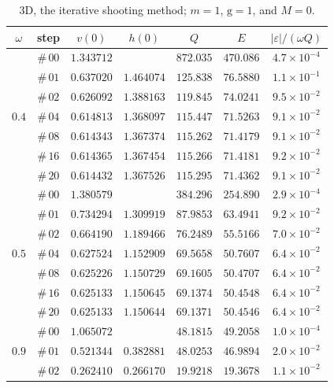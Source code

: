 \documentclass[12pt]{extarticle}
\newcommand{\coupling}{\mathrm{g}}
\theoremstyle{plain}
\theoremstyle{remark}
\begin{document}
\begin{table}[!ht]
\begin{center}
\caption{\footnotesize
3D, the iterative shooting method; $m=1$, $\coupling=1$, and $M=0$.
}
\begin{tabular}{ccccccc} \toprule
$\omega$ & step & $v(0)$ & $h(0)$ & $Q$ & $E$ & $|\varepsilon|/(\omega Q)$\\
\midrule
\multirow{7}{*}{$0.4$} & $\#\,00$ & $1.343712$ &  & $872.035$ & $470.086$ & $4.7\times10^{-4}$ \\
 & $\#\,01$ & $0.637020$ & $1.464074$ & $125.838$ & $76.5880$ & $1.1\times10^{-1}$ \\
 & $\#\,02$ & $0.626092$ & $1.388163$ & $119.845$ & $74.0241$ & $9.5\times10^{-2}$ \\
 & $\#\,04$ & $0.614813$ & $1.368097$ & $115.447$ & $71.5263$ & $9.1\times10^{-2}$ \\
 & $\#\,08$ & $0.614343$ & $1.367374$ & $115.262$ & $71.4179$ & $9.1\times10^{-2}$ \\
 & $\#\,16$ & $0.614365$ & $1.367454$ & $115.266$ & $71.4181$ & $9.2\times10^{-2}$ \\
 & $\#\,20$ & $0.614432$ & $1.367526$ & $115.295$ & $71.4362$ & $9.1\times10^{-2}$ \\
\midrule
\multirow{7}{*}{$0.5$} & $\#\,00$ & $1.380579$ &  & $384.296$ & $254.890$ & $2.9\times10^{-4}$ \\
 & $\#\,01$ & $0.734294$ & $1.309919$ & $87.9853$ & $63.4941$ & $9.2\times10^{-2}$ \\
 & $\#\,02$ & $0.664190$ & $1.189466$ & $76.2489$ & $55.5166$ & $7.0\times10^{-2}$ \\
 & $\#\,04$ & $0.627524$ & $1.152909$ & $69.5658$ & $50.7607$ & $6.4\times10^{-2}$ \\
 & $\#\,08$ & $0.625226$ & $1.150729$ & $69.1605$ & $50.4707$ & $6.4\times10^{-2}$ \\
 & $\#\,16$ & $0.625133$ & $1.150645$ & $69.1374$ & $50.4548$ & $6.4\times10^{-2}$ \\
 & $\#\,20$ & $0.625133$ & $1.150644$ & $69.1371$ & $50.4546$ & $6.4\times10^{-2}$ \\
\midrule
\multirow{7}{*}{$0.9$} & $\#\,00$ & $1.065072$ &  & $48.1815$ & $49.2058$ & $1.0\times10^{-4}$ \\
 & $\#\,01$ & $0.521344$ & $0.382881$ & $48.0253$ & $46.9894$ & $2.0\times10^{-2}$ \\
 & $\#\,02$ & $0.262410$ & $0.266170$ & $19.9218$ & $19.3678$ & $1.1\times10^{-2}$ \\

\end{tabular}
\end{center}
\end{table}
\end{document}
